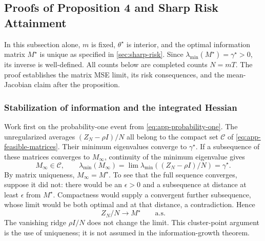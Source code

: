 \documentclass[10pt,twoside,letterpaper]{article}
\begin{document}
\subsection{Proofs of Proposition 4 and Sharp Risk Attainment}
\label{app:risk}

In this subsection alone, $m$ is fixed, $\theta^\star$ is interior,
and the optimal information matrix $M^\star$ is unique as specified
in \cref{sec:sharp-risk}. Since $\lambda_{\min}(M^\star)=\gamma^\star>0$,
its inverse is well-defined. All counts below are completed counts
$N=mT$. The proof establishes the matrix MSE limit, its risk
consequences, and the mean-Jacobian claim after the proposition.

\subsubsection{Stabilization of information and the integrated Hessian}

Work first on the probability-one event from
\eqref{eq:app-probability-one}. The unregularized averages
$(Z_N-\rho I)/N$ all belong to the compact set $\mathcal C$ of
\eqref{eq:app-feasible-matrices}. Their minimum eigenvalues converge
to $\gamma^\star$. If a subsequence of these matrices converges to
$M_\infty$, continuity of the minimum eigenvalue gives
\begin{equation}
M_\infty\in\mathcal C,\qquad
\lambda_{\min}(M_\infty)=
\lim\lambda_{\min}((Z_N-\rho I)/N)=\gamma^\star.
\label{eq:app-optimal-cluster-point}
\end{equation}
By matrix uniqueness, $M_\infty=M^\star$.
To see that the full sequence converges, suppose it did not: there
would be an $\epsilon>0$ and a subsequence at distance at least
$\epsilon$ from $M^\star$. Compactness would supply a convergent
further subsequence, whose limit would be both optimal and at that
distance, a contradiction. Hence
\begin{equation}
Z_N/N\longrightarrow M^\star\qquad\text{a.s.}
\label{eq:app-matrix-stabilization}
\end{equation}
The vanishing ridge $\rho I/N$ does not change the limit.
This cluster-point argument is the use of uniqueness; it is not
assumed in the information-growth theorem.
\end{document}
